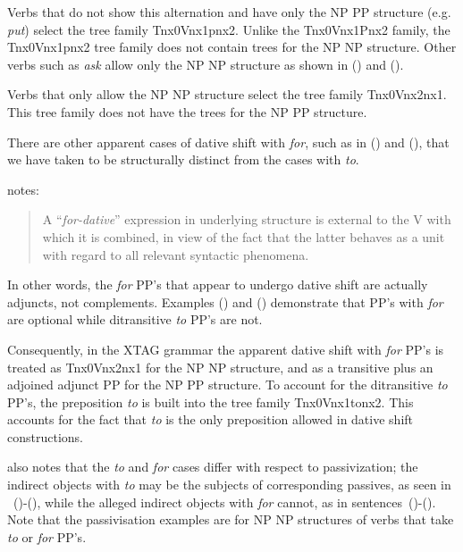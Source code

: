 
Verbs that do not show this alternation and have only the NP PP structure
(e.g. {\it put\/}) select the tree family Tnx0Vnx1pnx2.  Unlike the
Tnx0Vnx1Pnx2 family, the Tnx0Vnx1pnx2 tree family does not contain trees for
the NP NP structure. Other verbs such as {\it ask} allow only the NP NP
structure as shown in () and ().


Verbs that only allow the NP NP structure select the tree family
Tnx0Vnx2nx1. This tree family does not have the trees for the NP PP
structure. 

There are other apparent cases of dative shift with {\it for}, such as in
() and (), that we have taken to be structurally distinct from the
cases with {\it to}.


\cite{mccawley88} notes:

\begin{quote}
A ``{\it for-dative}'' expression in underlying structure is external
to the V with which it is combined, in view of the fact that the
latter behaves as a unit with regard to all relevant syntactic
phenomena.
\end{quote}


In other words, the {\it for} PP's that appear to undergo dative shift are
actually adjuncts, not complements. Examples () and () demonstrate
that PP's with {\it for} are optional while ditransitive {\it to} PP's are not.


Consequently, in the XTAG grammar the apparent dative shift with {\it
  for} PP's is treated as Tnx0Vnx2nx1 for the NP NP structure, and as
a transitive plus an adjoined adjunct PP for the NP PP structure.  To
account for the ditransitive {\it to} PP's, the preposition {\it to}
is built into the tree family Tnx0Vnx1tonx2. This accounts for the
fact that {\it to} is the only preposition allowed in dative shift
constructions.

\cite{mccawley88} also notes that the {\it to} and {\it for} cases
differ with respect to passivization; the indirect objects with {\it to} may be
the subjects of corresponding passives, as seen in ~()-(), while
the alleged indirect objects with {\it for} cannot, as in
sentences~()-().  Note that the passivisation examples are for NP
NP structures of verbs that take {\it to} or {\it for} PP's.

